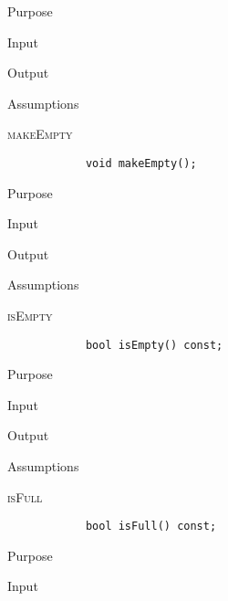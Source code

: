 \documentclass[pdftex, 12pt]{article}
\begin{document}
\begin{description}
		\begin{description}

			\item{Purpose}

			\item{Input}

			\item{Output}

			\item{Assumptions}

		\end{description}

	\item{\textsc{makeEmpty}}
		\begin{lstlisting}
			void makeEmpty();
		\end{lstlisting}
		\begin{description}

			\item{Purpose}

			\item{Input}

			\item{Output}

			\item{Assumptions}

		\end{description}
	\item{\textsc{isEmpty}}
		\begin{lstlisting}
			bool isEmpty() const;
		\end{lstlisting}
		\begin{description}

			\item{Purpose}

			\item{Input}

			\item{Output}

			\item{Assumptions}

		\end{description}
	\item{\textsc{isFull}}
		\begin{lstlisting}
			bool isFull() const;
		\end{lstlisting}
		\begin{description}

			\item{Purpose}

			\item{Input}


\end{description}
\end{description}
\end{document}
